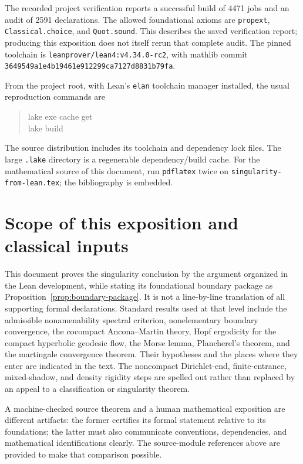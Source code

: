 \documentclass[11pt,a4paper]{article}
\theoremstyle{definition}
\theoremstyle{remark}
\numberwithin{equation}{section}
\begin{document}
The recorded project verification reports a successful build of 4471
jobs and an audit of 2591 declarations. The allowed foundational axioms
are \texttt{propext}, \texttt{Classical.choice}, and \texttt{Quot.sound}.
This describes the saved verification report; producing this exposition
does not itself rerun that complete audit. The pinned toolchain is
\texttt{leanprover/lean4:v4.34.0-rc2}, with mathlib commit
\texttt{3649549a1e4b19461e912299ca7127d8831b79fa}.

From the project root, with Lean's \texttt{elan} toolchain manager installed,
the usual reproduction commands are
\begin{quote}\ttfamily
lake exe cache get\\
lake build
\end{quote}
The source distribution includes its toolchain and dependency lock files.
The large \texttt{.lake} directory is a regenerable dependency/build cache.
For the mathematical source of this document, run \texttt{pdflatex} twice
on \texttt{singularity-from-lean.tex}; the bibliography is embedded.

\section{Scope of this exposition and classical inputs}
This document proves the singularity conclusion by the argument organized
in the Lean development, while stating its foundational boundary package
as Proposition~\ref{prop:boundary-package}. It is not a line-by-line
translation of all supporting formal declarations. Standard results used
at that level include the admissible nonamenability spectral criterion,
nonelementary boundary convergence, the cocompact Ancona--Martin theory,
Hopf ergodicity for the compact hyperbolic geodesic flow, the Morse lemma,
Plancherel's theorem, and the martingale convergence theorem. Their
hypotheses and the places where they enter are indicated in the text.
The noncompact Dirichlet-end, finite-entrance, mixed-shadow, and density
rigidity steps are spelled out rather than replaced by an appeal to a
classification or singularity theorem.

A machine-checked source theorem and a human mathematical exposition are
different artifacts: the former certifies its formal statement relative
to its foundations; the latter must also communicate conventions,
dependencies, and mathematical identifications clearly. The source-module
references above are provided to make that comparison possible.
\end{document}
